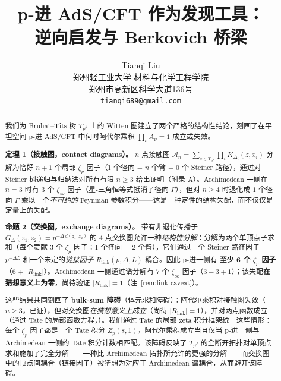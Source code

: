 \documentclass[11pt,a4paper]{ctexart}
\title{\Large \bfseries p-进 AdS/CFT 作为发现工具：\\
逆向启发与 Berkovich 桥梁}
\author{
    \large Tianqi Liu\\[4pt]
    \normalsize 郑州轻工业大学 材料与化学工程学院\\
    郑州市高新区科学大道136号\\[4pt]
    \normalsize \texttt{tianqi689@gmail.com}
}
\date{}
\theoremstyle{remark}
\newcommand{\BirTits}{Bruhat--Tits}
\begin{document}
\maketitle

\begin{abstract}
\noindent
我们为 \BirTits{} 树 $T_{p^d}$ 上的 Witten 图建立了两个严格的结构性结论，刻画了在平坦空间 p-进 AdS/CFT 中何时阿代尔乘积 $\prod_\nu A_\nu = 1$ 成立或失效。

\medskip
\noindent
\textbf{定理 1（接触图，contact diagrams）。} $n$ 点接触图 $\mathcal{A}_n = \sum_{z \in T_{p^d}} \prod_i K_{\Delta_i}(z, x_i)$ 分解为恰好 $n{+}1$ 个局部 $\zeta_p$ 因子（1 个径向 + $n$ 个臂 + 0 个 Steiner 路径），通过对 Steiner 树递归与归纳法对所有有限 $n \geq 3$ 给出证明（附录 A）。Archimedean 一侧在 $n=3$ 时有 $3$ 个 $\zeta_\infty$ 因子（星-三角恒等式抵消了径向 $\Gamma$），但对 $n \geq 4$ 时退化成 $1$ 个径向 $\Gamma$ 乘以一个\emph{不可约的} Feynman 参数积分——这是一种定性的结构失配，而不仅仅是定量上的失配。

\medskip
\noindent
\textbf{命题 2（交换图，exchange diagrams）。} 带有非退化传播子 $G_\Delta(z_1, z_2) = p^{-\Delta\,d(z_1,z_2)}$ 的 4 点交换图允许一种\emph{结构性分解}：分解为两个单顶点子求和（每个贡献 3 个 $\zeta_p$ 因子：1 个径向 + 2 个臂），它们通过一个 Steiner 路径因子 $p^{-\Delta L}$ 和一个未定的\emph{链接因子} $R_{\mathrm{link}}(p, \Delta, L)$ 耦合。因此 p-进一侧有 \textbf{至少 6 个 $\zeta_p$ 因子}（6 + $|R_{\mathrm{link}}|$）。Archimedean 一侧通过谱分解有 $7$ 个 $\zeta_\infty$ 因子（$3 + 3 + 1$）；该失配\textbf{在猜想意义上为零}，尚待验证 $|R_{\mathrm{link}}| = 1$（注~\ref{rem:link-caveat}）。

\medskip
\noindent
这些结果共同刻画了 \textbf{bulk-sum 障碍}（体元求和障碍）：阿代尔乘积对接触图失效（$n \geq 3$，已证），但对交换图\emph{在猜想意义上成立}（尚待 $|R_{\mathrm{link}}| = 1$），并对两点函数成立（通过 Tate 的局部函数方程，\cite{HSYZ20}）。我们通过 Tate 的局部 zeta 积分框架统一这些情形：每个 $\zeta_p$ 因子都是一个 Tate 积分 $Z_p(s, 1)$，阿代尔乘积成立当且仅当 p-进一侧与 Archimedean 一侧的 Tate 积分计数相匹配。该障碍反映了 $T_{p^d}$ 的全断开拓扑对单顶点求和施加了完全分解——一种比 Archimedean 拓扑所允许的更强的分解——而交换图中的顶点间耦合（链接因子）被猜想为对应于 Archimedean 谱耦合，从而避开该障碍。
\end{abstract}

\tableofcontents
\newpage

\end{document}
